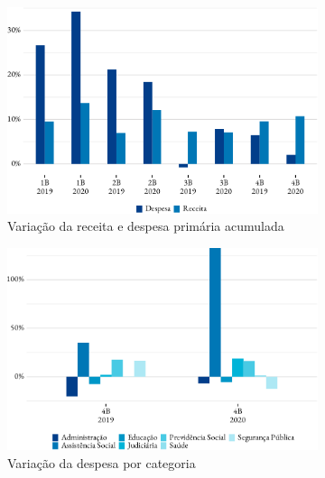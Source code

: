 \begin{figure}[!h]
	\begin{subfigure}{\linewidth}
		\caption{\label{fig:var_receita_despesa_primaria}Variação da receita e despesa primária acumulada}
		\includegraphics{fig/var_receita_despesa_primaria-1.pdf}
		\notes{\bimestres[1-4]}
	\end{subfigure}
	\begin{subfigure}{\linewidth}
		\caption{\label{fig:var_despesa_categoria}Variação da despesa por categoria}
		\includegraphics{fig/var_despesa_categoria-1.pdf}
		\notes{\bimestres[4]}
	\end{subfigure}
	\begin{subfigure}{\linewidth}

\end{subfigure}
\end{figure}
